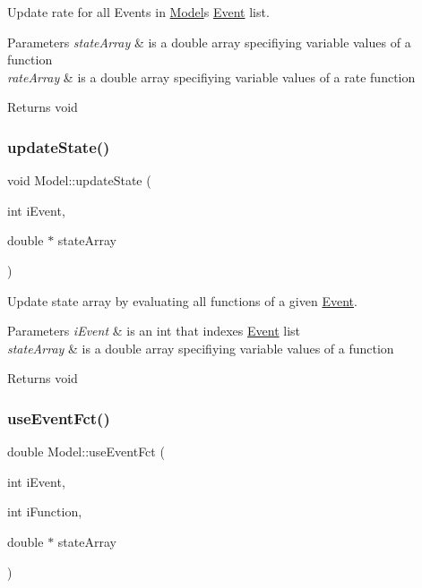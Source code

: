 Update rate for all Events in \hyperlink{class_model}{Model}\textquotesingle{}s \hyperlink{class_event}{Event} list. 


\begin{DoxyParams}{Parameters}
{\em state\+Array} & is a double array specifiying variable values of a function \\
\hline
{\em rate\+Array} & is a double array specifiying variable values of a rate function \\
\hline
\end{DoxyParams}
\begin{DoxyReturn}{Returns}
void 
\end{DoxyReturn}
\mbox{\label{class_model_ad9e7a181a31a2a9fab052d11b1984afd}} 
\subsubsection{\texorpdfstring{update\+State()}{updateState()}}
{\footnotesize\ttfamily void Model\+::update\+State (\begin{DoxyParamCaption}\item[{int}]{i\+Event,  }\item[{double $\ast$}]{state\+Array }\end{DoxyParamCaption})}



Update state array by evaluating all functions of a given \hyperlink{class_event}{Event}. 


\begin{DoxyParams}{Parameters}
{\em i\+Event} & is an int that indexes \hyperlink{class_event}{Event} list \\
\hline
{\em state\+Array} & is a double array specifiying variable values of a function \\
\hline
\end{DoxyParams}
\begin{DoxyReturn}{Returns}
void 
\end{DoxyReturn}
\mbox{\label{class_model_a774d9fb034f8704a75d7b3568a87a3bc}} 
\subsubsection{\texorpdfstring{use\+Event\+Fct()}{useEventFct()}}
{\footnotesize\ttfamily double Model\+::use\+Event\+Fct (\begin{DoxyParamCaption}\item[{int}]{i\+Event,  }\item[{int}]{i\+Function,  }\item[{double $\ast$}]{state\+Array }\end{DoxyParamCaption})}



